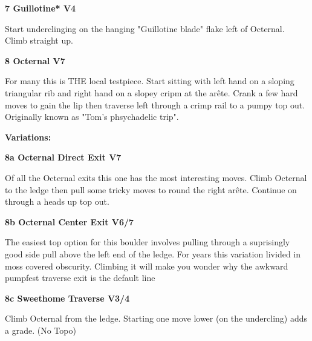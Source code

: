 \begin{multicols}{2}
\needspace{1.5cm}
\label{rt:Guillotine}
\colorbox{RoyalBlue!20}{
\parbox{0.95\linewidth}{
\textbf{
7 Guillotine* V4  
}}}
\begin{adjustwidth}{0.5cm}{}			
Start underclinging on the hanging "Guillotine blade" flake left of Octernal. Climb straight up.
\end{adjustwidth}




\needspace{1.5cm}
\label{rt:Octernal}
\colorbox{Goldenrod!20}{
\parbox{0.95\linewidth}{
\textbf{
8 Octernal V7  
}}}
\begin{adjustwidth}{0.5cm}{}			
For many this is THE local testpiece. Start sitting with left hand on a sloping triangular rib and right hand on a slopey cripm at the arête. Crank a few hard moves to gain the lip then traverse left through a crimp rail to a pumpy top out. Originally known as "Tom's phsychadelic trip".
\end{adjustwidth}


\begin{adjustwidth}{0.5cm}{}				
\needspace{3cm}
\textbf{Variations:} \newline

\needspace{1.5cm}
\label{vr:Octernal Direct Exit}
\colorbox{Goldenrod!20}{
\parbox{0.95\linewidth}{
\textbf{
8a Octernal Direct Exit V7  
}}}
\begin{adjustwidth}{0.5cm}{}			
Of all the Octernal exits this one has the most interesting moves. Climb Octernal to the ledge then pull some tricky moves to round the right arête. Continue on through a heads up top out.
\end{adjustwidth}




\needspace{1.5cm}
\label{vr:Octernal Center Exit}
\colorbox{Goldenrod!20}{
\parbox{0.95\linewidth}{
\textbf{
8b Octernal Center Exit V6/7  
}}}
\begin{adjustwidth}{0.5cm}{}			
The easiest top option for this boulder involves pulling through a suprisingly good side pull above the left end of the ledge. For years this variation livided in moss covered obscurity. Climbing it will make you wonder why the awkward pumpfest traverse exit is the default line
\end{adjustwidth}




\needspace{1.5cm}
\label{vr:Sweethome Traverse}
\colorbox{RoyalBlue!20}{
\parbox{0.95\linewidth}{
\textbf{
8c Sweethome Traverse V3/4  
}}}
\begin{adjustwidth}{0.5cm}{}			
Climb Octernal from the ledge. Starting one move lower (on the undercling) adds a grade.
  (No Topo)
\end{adjustwidth}




\end{adjustwidth}
\end{multicols}
